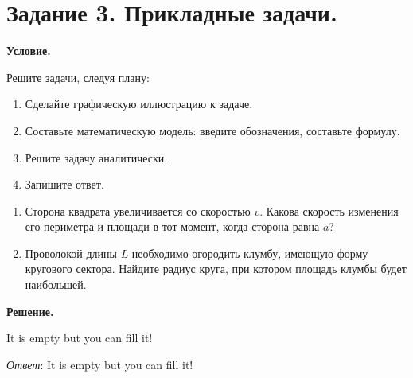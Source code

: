 \section{Задание 3. Прикладные задачи.}

\textbf{Условие.}

Решите задачи, следуя плану:
\begin{enumerate}
    \item Сделайте графическую иллюстрацию к задаче.
    \item Составьте математическую модель: введите обозначения, составьте формулу.
    \item Решите задачу аналитически.
    \item Запишите ответ.
\end{enumerate}

\begin{enumerate}
    \item Сторона квадрата увеличивается со скоростью $v$.
    Какова скорость изменения его периметра и площади в тот момент, когда сторона равна $a$?
    \item Проволокой длины $L$ необходимо огородить клумбу, имеющую форму кругового сектора.
    Найдите радиус круга, при котором площадь клумбы будет наибольшей.
\end{enumerate}
\vspace{10mm}
\textbf{Решение.}

It is empty but you can fill it!

\textit{Ответ}: It is empty but you can fill it!
\clearpage
